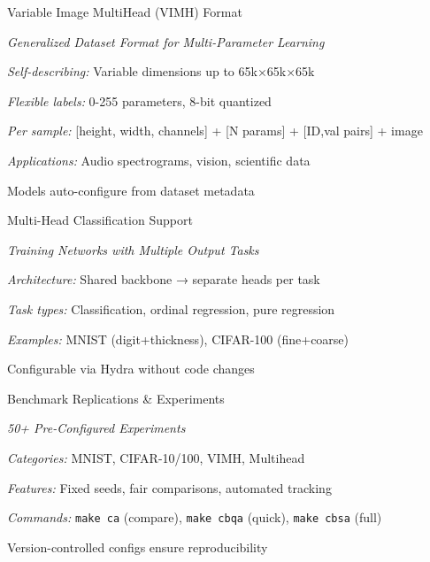 \begin{slide}[\slideopts,toc={VIMH}]{Variable Image MultiHead (VIMH) Format}
  
  \emph{Generalized Dataset Format for Multi-Parameter Learning}
  
  \begin{itemize}
    \mpitem \emph{Self-describing:} Variable dimensions up to 65k×65k×65k
    
    \mpitem \emph{Flexible labels:} 0-255 parameters, 8-bit quantized
    
    \mpitem \emph{Per sample:} [height, width, channels] + [N params] + [ID,val pairs] + image
    
    \mpitem \emph{Applications:} Audio spectrograms, vision, scientific data
    
    \mpitem Models auto-configure from dataset metadata
  \end{itemize}
\end{slide}

\begin{slide}[\slideopts,toc={MultiHead}]{Multi-Head Classification Support}
  
  \emph{Training Networks with Multiple Output Tasks}
  
  \begin{itemize}
    \mpitem \emph{Architecture:} Shared backbone → separate heads per task
    
    \mpitem \emph{Task types:} Classification, ordinal regression, pure regression
    
    \mpitem \emph{Examples:} MNIST (digit+thickness), CIFAR-100 (fine+coarse)
    
    \mpitem Configurable via Hydra without code changes
  \end{itemize}
\end{slide}

\begin{slide}[\slideopts,toc={Benchmarks}]{Benchmark Replications \& Experiments}
  
  \emph{50+ Pre-Configured Experiments}
  
  \begin{itemize}
    \mpitem \emph{Categories:} MNIST, CIFAR-10/100, VIMH, Multihead
    
    \mpitem \emph{Features:} Fixed seeds, fair comparisons, automated tracking
    
    \mpitem \emph{Commands:} \texttt{make ca} (compare), \texttt{make cbqa} (quick), \texttt{make cbsa} (full)
    
    \mpitem Version-controlled configs ensure reproducibility
  \end{itemize}
\end{slide}

